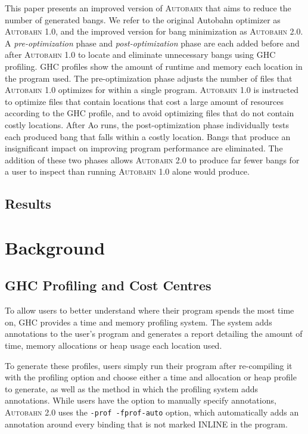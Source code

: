 \documentclass[format=sigplan]{acmart}
\newcommand{\Ao}[0]{\textsc{Autobahn 1.0}}
\newcommand{\At}[0]{\textsc{Autobahn 2.0}}
\newcommand{\preopt}[0]{pre-optimization}
\newcommand{\postopt}[0]{post-optimization}
\begin{document}
This paper presents an improved version of \textsc{Autobahn} that aims to reduce the number of generated bangs. We refer to the original Autobahn optimizer as \Ao{}, and the improved version for bang minimization as \At{}. A \textit{\preopt{}} phase and \textit{\postopt{}} phase are each added before and after \Ao{} to locate and eliminate unnecessary bangs using GHC profiling. GHC profiles show the amount of runtime and memory each location in the program used. The \preopt{} phase adjusts the number of files that \Ao{} optimizes for within a single program. \Ao{} is instructed to optimize files that contain locations that cost a large amount of resources according to the GHC profile, and to avoid optimizing files that do not contain costly locations. After Ao{} runs, the \postopt{} phase individually tests each produced bang that falls within a costly location. Bangs that produce an insignificant impact on improving program performance are eliminated. The addition of these two phases allows \At{} to produce far fewer bangs for a user to inspect than running \Ao{} alone would produce.

\subsection{Results}

\section{Background}

\subsection{GHC Profiling and Cost Centres}
To allow users to better understand where their program spends 
the most time on, GHC provides a time and memory profiling system. The
system adds annotations to the user's program and generates a report
detailing the amount of time, memory allocations or heap usage each 
location used. 

To generate these profiles, users simply run their program 
after re-compiling it with the profiling option and choose either a time and allocation or heap profile to generate, as well as the method in which the profiling 
system adds annotations. While users have the option to manually specify
annotations, \At{} uses the \texttt{-prof -fprof-auto} option, which
automatically adds an annotation around every binding that is not marked
INLINE in the program.
\end{document}
